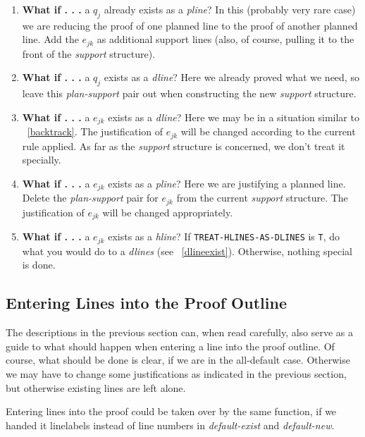 \begin{enumerate}
\item {\bf What if . . . } a $q_j$ already exists as a {\it pline}?  In this (probably very rare case)
we are reducing the proof of one planned line to the proof of another planned
line.  Add the $e_{jk}$ as additional support lines (also, of course, pulling it
to the front of the {\it support} structure).

\item {\bf What if . . . } a $q_j$ exists as a {\it dline}?  Here we already proved what we need,
so leave this {\it plan-support} pair out when constructing the new {\it support}
structure.

\item \label{dlineexist} %
{\bf What if . . . } a $e_{jk}$ exists as a {\it dline}?  Here we may be in a situation similar to
~\ref{backtrack}.  The justification of $e_{jk}$ will be changed according to
the current rule applied.  As far as the {\it support} structure is concerned,
we don't treat it specially.

\item {\bf What if . . . } a $e_{jk}$ exists as a {\it pline}?  Here we are justifying a planned line.
Delete the {\it plan-support} pair for $e_{jk}$ from the current {\it support}
structure.  The justification of $e_{jk}$ will be changed appropriately.

\item {\bf What if . . . } a $e_{jk}$ exists as a {\it hline}?  If {\tt TREAT-HLINES-AS-DLINES} is {\tt T}, do
what you would do to a {\it dlines} (see ~\ref{dlineexist}).  Otherwise, nothing
special is done.

\end{enumerate}

\subsection{Entering Lines into the Proof Outline}

The descriptions in the previous section can, when read carefully, also
serve as a guide to what should happen when entering a line into the
proof outline.  Of course, what should be done is clear, if we are in the
all-default case.  Otherwise we may have to change some justifications
as indicated in the previous section, but otherwise existing lines are left
alone.

Entering lines into the proof could be taken over by the same function, if
we handed it linelabels instead of line numbers in {\it default-exist} and
{\it default-new}.

